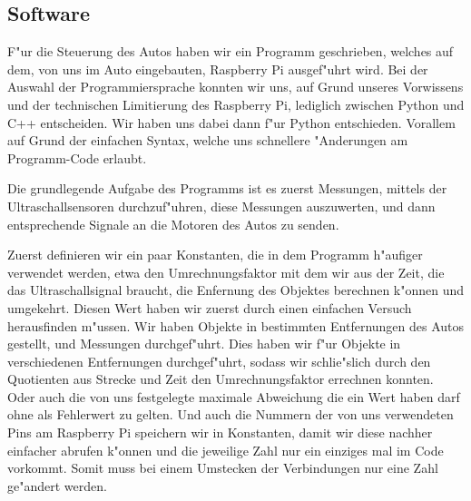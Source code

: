 \documentclass[a4paper,12pt]{article}
\begin{document}
\subsection{Software}\label{sec2.2}

F"ur die Steuerung des Autos haben wir ein Programm geschrieben, welches auf dem, von uns im Auto eingebauten, Raspberry Pi ausgef"uhrt wird.
Bei der Auswahl der Programmiersprache konnten wir uns, auf Grund unseres Vorwissens und der technischen Limitierung des Raspberry Pi, lediglich zwischen Python und C++ entscheiden. Wir haben uns dabei dann f"ur Python entschieden.
Vorallem auf Grund der einfachen Syntax, welche uns schnellere "Anderungen am Programm-Code erlaubt.

Die grundlegende Aufgabe des Programms ist es zuerst Messungen, mittels der Ultraschallsensoren durchzuf"uhren, diese Messungen auszuwerten, und dann entsprechende Signale an die Motoren des Autos zu senden.

\medskip

Zuerst definieren wir ein paar Konstanten, die in dem Programm h"aufiger verwendet werden, etwa den Umrechnungsfaktor mit dem wir aus der Zeit, die das Ultraschallsignal braucht, die Enfernung des Objektes berechnen k"onnen und umgekehrt.
Diesen Wert haben wir zuerst durch einen einfachen Versuch herausfinden m"ussen. Wir haben Objekte in bestimmten Entfernungen des Autos gestellt, und Messungen durchgef"uhrt.
Dies haben wir f"ur Objekte in verschiedenen Entfernungen durchgef"uhrt, sodass wir schlie"slich durch den Quotienten aus Strecke und Zeit den Umrechnungsfaktor errechnen konnten.
Oder auch die von uns festgelegte maximale Abweichung die ein Wert haben darf ohne als Fehlerwert zu gelten.
Und auch die Nummern der von uns verwendeten Pins am Raspberry Pi speichern wir in Konstanten, damit wir diese nachher einfacher abrufen k"onnen und die jeweilige Zahl nur ein einziges mal im Code vorkommt.
Somit muss bei einem Umstecken der Verbindungen nur eine Zahl ge"andert werden.
\end{document}
